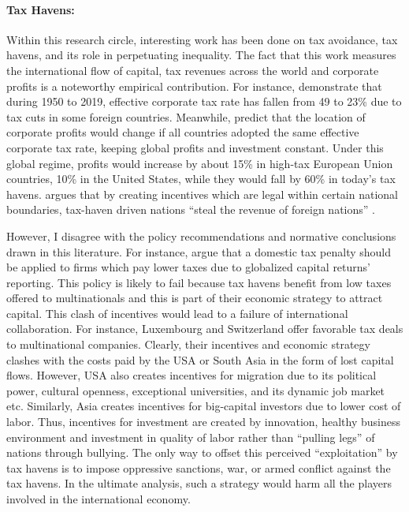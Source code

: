 \documentclass[12pt]{article}
\newcommand{\1}{\mathbbm 1}
\begin{document}
		
		\paragraph{Tax Havens:}
		
		Within this research circle, interesting work has been done on tax avoidance, tax havens, and its role in perpetuating inequality. The fact that this work measures the international flow of capital, tax revenues across the world and corporate profits is a noteworthy empirical contribution. For instance, \cite{clausing2021ending} demonstrate that during 1950 to 2019, effective corporate tax rate has fallen from 49 to 23\% due to tax cuts in some foreign countries. Meanwhile, \cite{torslov2023missing} predict that the location of corporate profits would change if all countries adopted  the  same  effective  corporate  tax  rate, keeping global profits and investment constant. Under this global regime, profits would increase by about 15\% in high-tax European Union countries, 10\% in the United States, while they would fall by 60\% in today's tax havens.  \cite{zucman2015hidden} argues that by creating incentives which are legal within certain national boundaries, tax-haven driven nations ``steal the revenue of foreign nations'' \cite{zucman2015hidden}.
		
		However, I disagree with the policy recommendations and normative conclusions drawn in this literature. For instance, \cite{clausing2021ending} argue that a domestic tax penalty should be applied to firms which pay lower taxes due to globalized capital returns' reporting. This policy is likely to fail because tax havens benefit from low taxes offered to multinationals and this is part of their economic strategy to attract capital. This clash of incentives would lead to a failure of international collaboration. For instance, Luxembourg and Switzerland offer favorable tax deals to multinational companies. Clearly, their incentives and economic strategy clashes with the costs paid by the USA or South Asia in the form of lost capital flows. However, USA also creates incentives for migration due to its political power, cultural openness, exceptional universities, and its dynamic job market etc. Similarly, Asia creates incentives for big-capital investors due to lower cost of labor. Thus, incentives for investment are created by innovation, healthy business environment and investment in quality of labor rather than ``pulling legs'' of nations through bullying. The only way to offset this perceived ``exploitation'' by tax havens is to impose oppressive sanctions, war, or armed conflict against the tax havens. In the ultimate analysis, such a strategy would harm all the players involved in the international economy.
		
\end{document}

